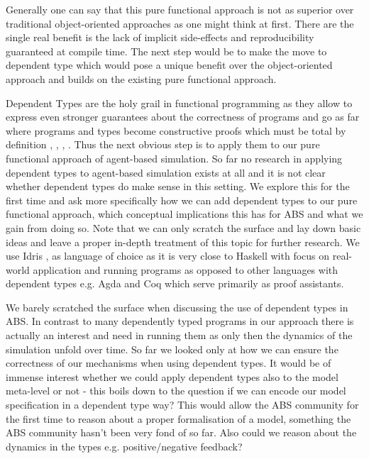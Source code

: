 Generally one can say that this pure functional approach is not as superior over traditional object-oriented approaches as one might think at first. There are the single real benefit is the lack of implicit side-effects and reproducibility guaranteed at compile time. The next step would be to make the move to dependent type which would pose a unique benefit over the object-oriented approach and builds on the existing pure functional approach.

Dependent Types are the holy grail in functional programming as they allow to express even stronger guarantees about the correctness of programs and go as far where programs and types become constructive proofs \cite{wadler_propositions_2015} which must be total by definition \cite{thompson_type_1991}, \cite{altenkirch_why_2005}, \cite{altenkirch_pi_sigma:_2010}, \cite{program_homotopy_2013}. Thus the next obvious step is to apply them to our pure functional approach of agent-based simulation. So far no research in applying dependent types to agent-based simulation exists at all and it is not clear whether dependent types do make sense in this setting. We explore this for the first time and ask more specifically how we can add dependent types to our pure functional approach, which conceptual implications this has for ABS and what we gain from doing so. Note that we can only scratch the surface and lay down basic ideas and leave a proper in-depth treatment of this topic for further research. We use Idris \cite{brady_idris_2013}, \cite{brady_type-driven_2017} as language of choice as it is very close to Haskell with focus on real-world application and running programs as opposed to other languages with dependent types e.g. Agda and Coq which serve primarily as proof assistants.

We barely scratched the surface when discussing the use of dependent types in ABS. In contrast to many dependently typed programs in our approach there is actually an interest and need in running them as only then the dynamics of the simulation unfold over time. So far we looked only at how we can ensure the correctness of our mechanisms when using dependent types. It would be of immense interest whether we could apply dependent types also to the model meta-level or not - this boils down to the question if we can encode our model specification in a dependent type way? This would allow the ABS community for the first time to reason about a proper formalisation of a model, something the ABS community hasn't been very fond of so far. Also could we reason about the dynamics in the types e.g. positive/negative feedback?

